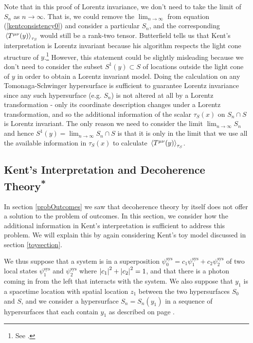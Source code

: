 Note that in this proof of Lorentz invariance, we don't need to take the limit of $S_n$ as $n\rightarrow\infty$. That is, we could remove the $\lim_{n\rightarrow\infty}$ from equation (\ref{kentconsistency0}) and consider a particular $S_n$, and the corresponding $\ev*{T^{\mu\nu}(y)}_{\tau_S}$ would still be a rank-two tensor. Butterfield tells us that Kent's interpretation is  Lorentz invariant because his algorithm respects the light cone structure of $y$.\footnote{See \cite[30]{Butterfield}.} However, this statement could be slightly misleading because we don't need to consider the subset $S^1(y)\subset S$ of locations outside the light cone of $y$ in order to obtain a Lorentz invariant model. Doing the calculation on any Tomonaga-Schwinger hypersurface is sufficient to guarantee Lorentz invariance since any such hypersurface (e.g. $S_n$) is not altered at all by a Lorentz transformation - only its coordinate description changes under a Lorentz transformation, and so the additional information of the scalar $\tau_S(x)$ on $S_n\cap S$ is Lorentz invariant. The only reason we need to consider the limit $\lim_{n\rightarrow \infty}S_n$ and hence $S^1(y)=\lim_{n\rightarrow \infty}S_n\cap S$ is that it is only in the limit that we use all the available information in $\tau_S(x)$ to calculate $\ev*{T^{\mu\nu}(y)}_{\tau_S}$. 



\subsection{Kent's Interpretation and Decoherence Theory\textsuperscript{*}}
In section \ref{probOutcomes} we saw that decoherence theory by itself does not offer a solution to the problem of outcomes. In this section, we consider how the additional information in Kent's interpretation is sufficient to address this problem. We will explain this by again considering  Kent's toy model discussed in section \ref{toysection}.

We thus suppose that a system is in a superposition $\psi_0^\text{sys} = c_1\psi_1^\text{sys}+c_2\psi_2^\text{sys}$ of two local states $\psi_1^\text{sys}$ and $\psi_2^\text{sys}$ where $\abs{c_1}^2+\abs{c_2}^2=1$, and that there is a photon coming in from the left that interacts with the system. We also suppose that  $y_1$ is a spacetime location with spatial location $z_1$ between the two hypersurfaces $S_0$ and $S$, and we consider a hypersurface $S_n=S_n(y_1)$  in a sequence of hypersurfaces that each contain $y_1$ as described on page \pageref{siydef}. 

